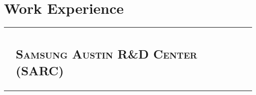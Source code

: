 \documentclass[letterpaper,10pt]{article}
\begin{document}
\section{Work Experience}
\begin{tabular}{R|p{6.2in}}

	                               & \subsection{\textsc{Samsung Austin R\&D Center (SARC)}}                                                                                                                                                                                                                                                                                                                                                                                                                                                                                                                                                                                                                                                                                                                                                                                                                                                                                                                                                                                                                                                                                                                                                                                           \\


\end{tabular}
\end{document}
